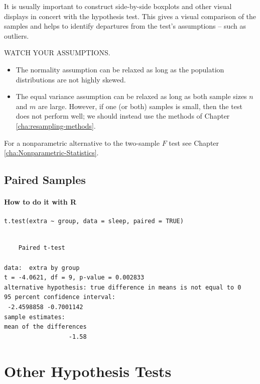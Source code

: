 \documentclass[captions=tableheading]{scrbook}
\begin{document}
\begin{rem}
It is usually important to construct side-by-side boxplots and other visual displays in concert with the hypothesis test. This gives a visual comparison of the samples and helps to identify departures from the test's assumptions -- such as outliers.
\end{rem}

\begin{rem}
WATCH YOUR ASSUMPTIONS.
\begin{itemize}
\item The normality assumption can be relaxed as long as the population distributions are not highly skewed.
\item The equal variance assumption can be relaxed as long as both sample sizes \(n\) and \(m\) are large. However, if one (or both) samples is small, then the test does not perform well; we should instead use the methods of Chapter \ref{cha:resampling-methods}.
\end{itemize}

\end{rem}

For a nonparametric alternative to the two-sample \(F\) test see Chapter \ref{cha:Nonparametric-Statistics}.
\subsection{Paired Samples}
\label{sec-10-3-2}


\paragraph*{How to do it with \textsf{R}}


\begin{verbatim}
t.test(extra ~ group, data = sleep, paired = TRUE)
\end{verbatim}


\begin{verbatim}

	Paired t-test

data:  extra by group 
t = -4.0621, df = 9, p-value = 0.002833
alternative hypothesis: true difference in means is not equal to 0 
95 percent confidence interval:
 -2.4598858 -0.7001142 
sample estimates:
mean of the differences 
                  -1.58
\end{verbatim}
\section{Other Hypothesis Tests}
\label{sec-10-4}
\end{document}
